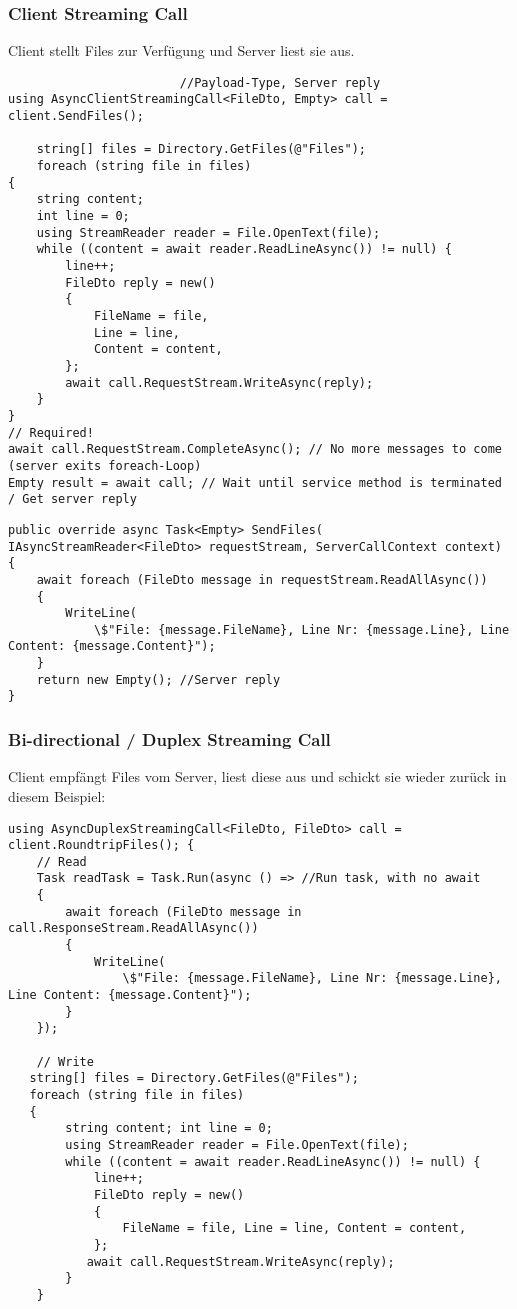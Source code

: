 \begin{multicols*}{2}
\subsubsection{Client Streaming Call}
Client stellt Files zur Verfügung und Server liest sie aus.
\begin{lstlisting}
                        //Payload-Type, Server reply
using AsyncClientStreamingCall<FileDto, Empty> call = client.SendFiles();

    string[] files = Directory.GetFiles(@"Files");
    foreach (string file in files)
{
    string content; 
    int line = 0;
    using StreamReader reader = File.OpenText(file);
    while ((content = await reader.ReadLineAsync()) != null) {
        line++;
        FileDto reply = new()
        {
            FileName = file, 
            Line = line, 
            Content = content, 
        };
        await call.RequestStream.WriteAsync(reply);
    } 
}
// Required!
await call.RequestStream.CompleteAsync(); // No more messages to come (server exits foreach-Loop) 
Empty result = await call; // Wait until service method is terminated / Get server reply
\end{lstlisting}
\begin{lstlisting}
public override async Task<Empty> SendFiles( IAsyncStreamReader<FileDto> requestStream, ServerCallContext context)
{
    await foreach (FileDto message in requestStream.ReadAllAsync())
    {
        WriteLine(
            \$"File: {message.FileName}, Line Nr: {message.Line}, Line Content: {message.Content}");
    }
    return new Empty(); //Server reply 
}
\end{lstlisting}
\subsubsection{Bi-directional / Duplex Streaming Call}
Client empfängt Files vom Server, liest diese aus und schickt sie wieder zurück in diesem Beispiel:
\begin{lstlisting}
using AsyncDuplexStreamingCall<FileDto, FileDto> call = client.RoundtripFiles(); {
    // Read
    Task readTask = Task.Run(async () => //Run task, with no await
    {
        await foreach (FileDto message in call.ResponseStream.ReadAllAsync()) 
        {
            WriteLine(
                \$"File: {message.FileName}, Line Nr: {message.Line}, Line Content: {message.Content}");
        } 
    });
        
    // Write
   string[] files = Directory.GetFiles(@"Files");
   foreach (string file in files)
   {
        string content; int line = 0;
        using StreamReader reader = File.OpenText(file);
        while ((content = await reader.ReadLineAsync()) != null) {
            line++; 
            FileDto reply = new()
            {
                FileName = file, Line = line, Content = content, 
            };
           await call.RequestStream.WriteAsync(reply);
        } 
    }


\end{lstlisting}
\end{multicols*}
